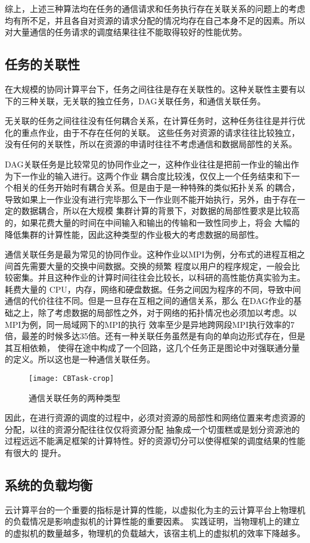 综上，上述三种算法均在任务的通信请求和任务执行存在关联关系的问题上的考虑均有所不足，并且各自对资源的请求分配的情况均存在自己本身不足的因素。所以对大量通信的任务请求的调度结果往往不能取得较好的性能优势。

\subsection{任务的关联性}
在大规模的协同计算平台下，任务之间往往是存在关联性的。这种关联性主要有以下的三种关联，无关联的独立任务，DAG关联任务，和通信关联任务。

无关联的任务之间往往没有任何耦合关系，在计算任务时，这种任务往往是并行优化的重点作业，由于不存在任何的关联。
这些任务对资源的请求往往比较独立，没有任何的关联性，所以在资源的申请时往往不考虑通信和数据局部性的关系。

DAG关联任务是比较常见的协同作业之一，这种作业往往是把前一作业的输出作为下一作业的输入进行。这两个作业
耦合度比较浅，仅仅上一个任务结束和下一个相关的任务开始时有耦合关系。但是由于是一种特殊的类似拓扑关系
的耦合，导致如果上一作业没有进行完毕那么下一作业则不能开始执行，另外，由于存在一定的数据耦合，所以在大规模
集群计算的背景下，对数据的局部性要求是比较高的，如果花费大量的时间在中间输入和输出的传输和一致性同步上，将会
大幅的降低集群的计算性能，因此这种类型的作业极大的考虑数据的局部性。

通信关联任务是最为常见的协同作业。这种作业以MPI为例，分布式的进程互相之间首先需要大量的交换中间数据。交换的频繁
程度以用户的程序规定，一般会比较密集。并且这种作业的计算时间往往会比较长，以科研的高性能仿真实验为主。耗费大量的
CPU，内存，网络和硬盘数据。任务之间因为程序的不同，导致中间通信的代价往往不同。但是一旦存在互相之间的通信关系，那么
在DAG作业的基础之上，除了考虑数据的局部性之外，对于网络的拓扑情况也必须加以考虑。以MPI为例，同一局域网下的MPI的执行
效率至少是异地跨网段MPI执行效率的7倍，最差的时候多达35倍。还有一种关联任务虽然是有向的单向边形式存在，但是其互相依赖，
使得在途中构成了一个回路，这几个任务正是图论中对强联通分量的定义。所以这也是一种通信关联任务。
\begin{figure}[htbp]
\centering\texttt{[image: CBTask-crop]}
\caption{通信关联任务的两种类型}\label{fig:CBTask}
\end{figure}

因此，在进行资源的调度的过程中，必须对资源的局部性和网络位置来考虑资源的分配，以往的资源分配往往仅仅将资源分配
抽象成一个切蛋糕或是划分资源池的过程远远不能满足框架的计算特性。好的资源切分可以使得框架的调度结果的性能有很大的
提升。

\subsection{系统的负载均衡}
云计算平台的一个重要的指标是计算的性能，以虚拟化为主的云计算平台上物理机的负载情况是影响虚拟机的计算性能的重要因素。
实践证明，当物理机上的建立的虚拟机的数量越多，物理机的负载越大，该宿主机上的虚拟机的效率下降越多。


